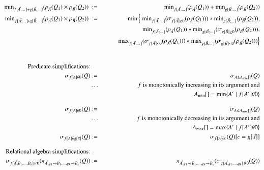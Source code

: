 \documentclass{article}
\begin{document}
\begin{figure*}
\begin{eqnarray}
\\
\label{eq:min6}
\algmin_{f[\vec{A};\dots] + g[\vec{B};\dots]}(\rho_{\vec{A}}(Q_1) \times \rho_{\vec{B}}(Q_2)) \; &:=&
\algmin_{f[\vec{A};\dots]}(\rho_{\vec{A}}(Q_1))
    + \algmin_{g[\vec{B};\dots]}(\rho_{\vec{B}}(Q_2))
\\
\label{eq:min7}
\algmin_{f[\vec{A};\dots] * g[\vec{B};\dots]}(\rho_{\vec{A}}(Q_1) \times \rho_{\vec{B}}(Q_2)) \; &:=&
\min \Big\{\;
\algmin_{f[\vec{A};\dots]} (\sigma_{f[\vec{A}] \geq 0} (\rho_{\vec{A}}(Q_1)))
    * \algmin_{g[\vec{B};\dots]} (\rho_{\vec{B}}(Q_2)), \nonumber\\
&& \qquad \;
\algmin_{f[\vec{A};\dots]} (\rho_{\vec{A}} (Q_1))
    * \algmin_{g[\vec{B};\dots]} (\sigma_{g[\vec{B}] \geq 0} (\rho_{\vec{B}}(Q_2))), \nonumber\\
&& \qquad \;
\algmax_{f[\vec{A};\dots]} (\sigma_{f[\vec{A}] < 0} (\rho_{\vec{A}} (Q_1)))
    * \algmax_{g[\vec{B};\dots]} (\sigma_{g[\vec{B}] < 0} (\rho_{\vec{B}}(Q_2)))
\Big\}
\\
%
%
%
\\[2ex]
\mbox{Predicate simplifications:} && \nonumber\\
\label{eq:pred1}
\sigma_{f[A] \theta 0}(Q) &:=& \sigma_{A \ge A_{\min}[]}(Q)
\\
&\dots& \mbox{$f$ is monotonically increasing in its argument and}
\nonumber
\\
&& A_{\min}[] = \min \{ A' \mid f[A'] \theta 0 \} 
\nonumber
\\[2ex]
\label{eq:pred2}
\sigma_{f[A] \theta 0}(Q) &:=& \sigma_{A \le A_{\max}[]}(Q)
\\
&\dots& \mbox{$f$ is monotonically decreasing in its argument and}
\nonumber
\\
&& A_{\max}[] = \max \{ A' \mid f[A'] \theta 0 \} 
\nonumber
\\
\label{eq:pred3}
\sigma_{f[A] \theta g[\vec{x}]}(Q) &:=& \sigma_{f[A] \theta c}(Q)[c=g[\vec{x}]]
%
%
\\[2ex]
\mbox{Relational algebra simplifications:} &&
\nonumber\\
\label{eq:rs1}
\sigma_{f[\vec{A}, B_1, \dots, B_k] \,\theta\, 0}
   (\pi_{\vec{A}, g_1 \rightarrow B_1, \dots, g_k \rightarrow B_k}(Q))
&:=&
\pi_{\vec{A}, g_1 \rightarrow B_1, \dots, g_k \rightarrow B_k}(
\sigma_{f[\vec{A}, g_1, \dots, g_k] \,\theta\, 0}(Q))
\end{eqnarray}
\end{figure*}
\end{document}
